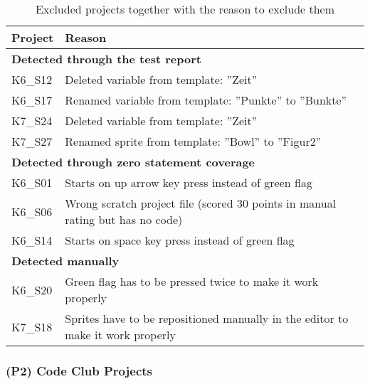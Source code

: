 \begin{table}
    \centering
    \scriptsize
    \begin{tabular}{ll}
        \toprule
        Project & Reason                                                                          \\
        \midrule
        \multicolumn{2}{l}{\textbf{Detected through the test report}}                             \\
        K6\_S12 & Deleted variable from template: ''Zeit''                                        \\
        K6\_S17 & Renamed variable from template: ''Punkte'' to ''Bunkte''                        \\
        K7\_S24 & Deleted variable from template: ''Zeit''                                        \\
        K7\_S27 & Renamed sprite from template: ''Bowl'' to ''Figur2''                            \\[\medskipamount]

        \multicolumn{2}{l}{\textbf{Detected through zero statement coverage}}                     \\
        K6\_S01 & Starts on up arrow key press instead of green flag                              \\
        K6\_S06 & Wrong scratch project file (scored 30 points in manual rating but has no code)  \\
        K6\_S14 & Starts on space key press instead of green flag                                 \\[\medskipamount]

        \multicolumn{2}{l}{\textbf{Detected manually}}                                            \\
        K6\_S20 & Green flag has to be pressed twice to make it work properly                     \\
        K7\_S18 & Sprites have to be repositioned manually in the editor to make it work properly \\
        \bottomrule
    \end{tabular}
    \caption{Excluded projects together with the reason to exclude them}
    \label{tab:excluded_projects}
\end{table}

\subsubsection{(P2) Code Club Projects}

